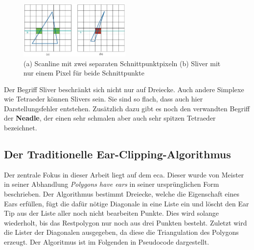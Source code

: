 \begin{figure}
  \centering
  \includegraphics[width=0.49\textwidth]{bilder/sliverScanline.png}
  \caption[Unterschied Sliver und normales Dreieck]{\centering (a) Scanline mit zwei separaten Schnittpunktpixeln (b) Sliver mit nur einem Pixel für beide Schnittpunkte}
  \label{fig:sliver}
\end{figure}

Der Begriff Sliver beschränkt sich nicht nur auf Dreiecke. Auch andere Simplexe wie Tetraeder können Slivers sein. Sie sind so flach, dass auch hier Darstellungsfehler entstehen.
Zusätzlich dazu gibt es noch den verwandten Begriff der \textbf{Neadle}, der einen sehr schmalen aber auch sehr spitzen Tetraeder bezeichnet.\cite{sliver} \linebreak

\subsection{Der Traditionelle Ear-Clipping-Algorithmus}

Der zentrale Fokus in dieser Arbeit liegt auf dem \ac{eca}. Dieser wurde von Meister in seiner Abhandlung \emph{Polygons have ears} \cite{meister} in seiner ursprünglichen Form beschrieben.
Der Algorithmus bestimmt Dreiecke, welche die Eigenschaft eines Ears erfüllen, fügt die dafür nötige Diagonale in eine Liste ein und löscht den Ear Tip aus der Liste aller noch nicht 
bearbeiten Punkte. Dies wird solange wiederholt, bis das Restpolygon nur noch aus drei Punkten besteht. Zuletzt wird die Lister der Diagonalen ausgegeben, da diese die Triangulation des Polygons erzeugt.
Der Algoritmus ist im Folgenden in Pseudocode dargestellt.

